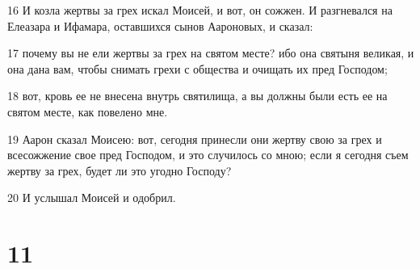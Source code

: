 \par 16 И козла жертвы за грех искал Моисей, и вот, он сожжен. И разгневался на Елеазара и Ифамара, оставшихся сынов Аароновых, и сказал:
\par 17 почему вы не ели жертвы за грех на святом месте? ибо она святыня великая, и она дана вам, чтобы снимать грехи с общества и очищать их пред Господом;
\par 18 вот, кровь ее не внесена внутрь святилища, а вы должны были есть ее на святом месте, как повелено мне.
\par 19 Аарон сказал Моисею: вот, сегодня принесли они жертву свою за грех и всесожжение свое пред Господом, и это случилось со мною; если я сегодня съем жертву за грех, будет ли это угодно Господу?
\par 20 И услышал Моисей и одобрил.

\chapter{11}

